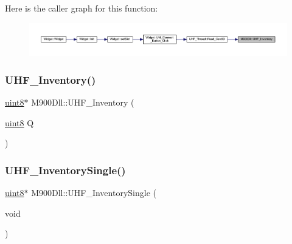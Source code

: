 Here is the caller graph for this function\+:
\nopagebreak
\begin{figure}[H]
\begin{center}
\leavevmode
\includegraphics[width=350pt]{class_m900_dll_a0f47f84947ac9f5bdd7080319663eb31_icgraph}
\end{center}
\end{figure}
\mbox{\label{class_m900_dll_af4d928099af991f4357b8fda4eee5501}} 
\subsubsection{\texorpdfstring{UHF\_Inventory()}{UHF\_Inventory()}\hspace{0.1cm}{\footnotesize\ttfamily [2/2]}}
{\footnotesize\ttfamily \mbox{\hyperlink{m900dll_8h_adde6aaee8457bee49c2a92621fe22b79}{uint8}}$\ast$ M900\+Dll\+::\+U\+H\+F\+\_\+\+Inventory (\begin{DoxyParamCaption}\item[{\mbox{\hyperlink{m900dll_8h_adde6aaee8457bee49c2a92621fe22b79}{uint8}}}]{Q }\end{DoxyParamCaption})}

\mbox{\label{class_m900_dll_a3be2c1f7556d8e05e7de1f4100d38c6f}} 
\subsubsection{\texorpdfstring{UHF\_InventorySingle()}{UHF\_InventorySingle()}}
{\footnotesize\ttfamily \mbox{\hyperlink{m900dll_8h_adde6aaee8457bee49c2a92621fe22b79}{uint8}}$\ast$ M900\+Dll\+::\+U\+H\+F\+\_\+\+Inventory\+Single (\begin{DoxyParamCaption}\item[{void}]{ }\end{DoxyParamCaption})}

\mbox{\label{class_m900_dll_ac7166c53f01e514ae3fc2855c4092528}} 
